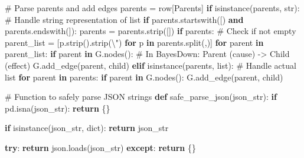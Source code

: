 \documentclass[
  11pt,
  letterpaper,
]{book}
\newenvironment{Shaded}{\begin{snugshade}}{\end{snugshade}}
\newcommand{\BuiltInTok}[1]{\textcolor[rgb]{0.00,0.23,0.31}{#1}}
\newcommand{\CharTok}[1]{\textcolor[rgb]{0.13,0.47,0.30}{#1}}
\newcommand{\CommentTok}[1]{\textcolor[rgb]{0.37,0.37,0.37}{#1}}
\newcommand{\ControlFlowTok}[1]{\textcolor[rgb]{0.00,0.23,0.31}{\textbf{#1}}}
\newcommand{\KeywordTok}[1]{\textcolor[rgb]{0.00,0.23,0.31}{\textbf{#1}}}
\newcommand{\NormalTok}[1]{\textcolor[rgb]{0.00,0.23,0.31}{#1}}
\newcommand{\OperatorTok}[1]{\textcolor[rgb]{0.37,0.37,0.37}{#1}}
\newcommand{\StringTok}[1]{\textcolor[rgb]{0.13,0.47,0.30}{#1}}
\begin{document}
\begin{Shaded}
\begin{Highlighting}[]
      \CommentTok{\# Parse parents and add edges}
\NormalTok{      parents }\OperatorTok{=}\NormalTok{ row[}\StringTok{\textquotesingle{}Parents\textquotesingle{}}\NormalTok{]}
      \ControlFlowTok{if} \BuiltInTok{isinstance}\NormalTok{(parents, }\BuiltInTok{str}\NormalTok{):}
          \CommentTok{\# Handle string representation of list}
          \ControlFlowTok{if}\NormalTok{ parents.startswith(}\StringTok{\textquotesingle{}[\textquotesingle{}}\NormalTok{) }\KeywordTok{and}\NormalTok{ parents.endswith(}\StringTok{\textquotesingle{}]\textquotesingle{}}\NormalTok{):}
\NormalTok{              parents }\OperatorTok{=}\NormalTok{ parents.strip(}\StringTok{\textquotesingle{}[]\textquotesingle{}}\NormalTok{)}
              \ControlFlowTok{if}\NormalTok{ parents:  }\CommentTok{\# Check if not empty}
\NormalTok{                  parent\_list }\OperatorTok{=}\NormalTok{ [p.strip().strip(}\StringTok{\textquotesingle{}}\CharTok{\textbackslash{}\textquotesingle{}}\StringTok{"\textquotesingle{}}\NormalTok{) }\ControlFlowTok{for}\NormalTok{ p }\KeywordTok{in}\NormalTok{ parents.split(}\StringTok{\textquotesingle{},\textquotesingle{}}\NormalTok{)]}
                  \ControlFlowTok{for}\NormalTok{ parent }\KeywordTok{in}\NormalTok{ parent\_list:}
                      \ControlFlowTok{if}\NormalTok{ parent }\KeywordTok{in}\NormalTok{ G.nodes():}
                          \CommentTok{\# In BayesDown: Parent (cause) {-}\textgreater{} Child (effect)}
\NormalTok{                          G.add\_edge(parent, child)}
      \ControlFlowTok{elif} \BuiltInTok{isinstance}\NormalTok{(parents, }\BuiltInTok{list}\NormalTok{):}
          \CommentTok{\# Handle actual list}
          \ControlFlowTok{for}\NormalTok{ parent }\KeywordTok{in}\NormalTok{ parents:}
              \ControlFlowTok{if}\NormalTok{ parent }\KeywordTok{in}\NormalTok{ G.nodes():}
\NormalTok{                  G.add\_edge(parent, child)}

  \CommentTok{\# Function to safely parse JSON strings}
  \KeywordTok{def}\NormalTok{ safe\_parse\_json(json\_str):}
      \ControlFlowTok{if}\NormalTok{ pd.isna(json\_str):}
          \ControlFlowTok{return}\NormalTok{ \{\}}

      \ControlFlowTok{if} \BuiltInTok{isinstance}\NormalTok{(json\_str, }\BuiltInTok{dict}\NormalTok{):}
          \ControlFlowTok{return}\NormalTok{ json\_str}

      \ControlFlowTok{try}\NormalTok{:}
          \ControlFlowTok{return}\NormalTok{ json.loads(json\_str)}
      \ControlFlowTok{except}\NormalTok{:}
          \ControlFlowTok{return}\NormalTok{ \{\}}


\end{Highlighting}
\end{Shaded}
\end{document}
